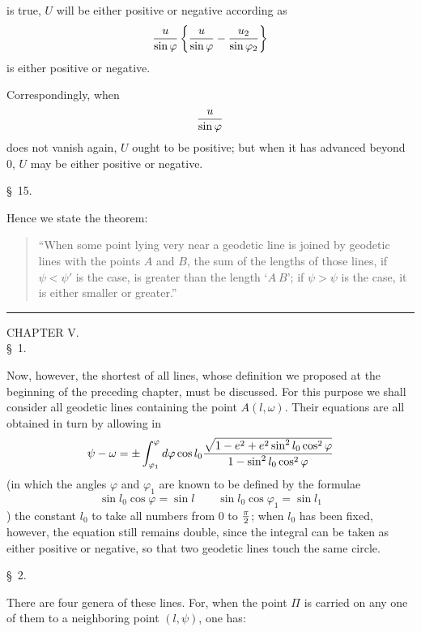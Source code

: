 is true, $U$ will be either positive or negative according as
\[
 {u\over \sin\varphi}\left\{{u\over \sin\varphi}-{u_2\over \sin\varphi_2}\right\}
\]
is either positive or negative.

Correspondingly, when
\[
 {u\over \sin\varphi}
\]
does not vanish again, $U$ ought to be positive; but when it has advanced beyond $0$, $U$ may be either positive or negative.

\begin{center}\S\ 15.\end{center}

Hence we state the theorem:
\begin{quote}
``When some point lying very near a geodetic line is joined by geodetic lines with the points $A$ and $B$, the sum of the lengths of those lines, if $\psi<\psi'$ is the case, is greater than the length `$A\ B$'; if $\psi>\psi$ is the case, it is either smaller or greater.''
\end{quote}

\bigskip\hrule\bigskip

\begin{center}
{\large CHAPTER V.}\\[0.8em]
\S\ 1.
\end{center}

Now, however, the shortest of all lines, whose definition we proposed at the beginning of the preceding chapter, must be discussed. For this purpose we shall consider all geodetic lines containing the point $A(l,\omega)$. Their equations are all obtained in turn by allowing in
\[
 \psi-\omega=\pm\int_{\varphi_1}^{\varphi}d\varphi\cos l_0{\sqrt{1-e^2+e^2\sin^2l_0\cos^2\varphi}\over 1-\sin^2l_0\cos^2\varphi}
\]
(in which the angles $\varphi$ and $\varphi_1$ are known to be defined by the formulae
\[
 \sin l_0\cos\varphi=\sin l\qquad \sin l_0\cos\varphi_1=\sin l_1
\]
) the constant $l_0$ to take all numbers from $0$ to ${\pi\over2}$; when $l_0$ has been fixed, however, the equation still remains double, since the integral can be taken as either positive or negative, so that two geodetic lines touch the same circle.

\begin{center}\S\ 2.\end{center}

There are four genera of these lines. For, when the point $\Pi$ is carried on any one of them to a neighboring point $(l,\psi)$, one has:
